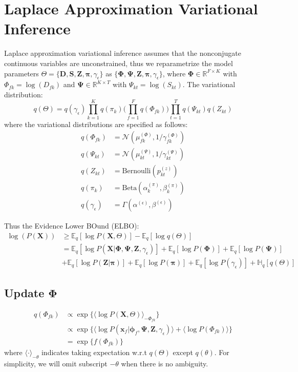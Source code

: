 \documentclass[11pt]{article} %
\begin{document}
\section{Laplace Approximation Variational Inference}
Laplace approximation variational inference assumes that the nonconjugate continuous variables are unconstrained, thus we reparametrize the model parameters $\Theta = \{\mathbf{D}, \mathbf{S}, \mathbf{Z}, \bm{\pi}, \gamma_\epsilon\}$ as $\{\mathbf{\Phi}, \mathbf{\Psi}, \mathbf{Z}, \bm{\pi}, \gamma_\epsilon\}$, where $\mathbf{\Phi} \in \mathbb{R}^{F\times K}$ with $\Phi_{fk} = \log(D_{fk})$ and $\mathbf{\Psi} \in \mathbb{R}^{K \times T}$ with $\Psi_{kt} = \log(S_{kt})$.
The variational distribution: 
\[
q(\Theta) = q(\gamma_\epsilon)\prod_{k=1}^K q(\pi_k) \biggl(\prod_{f=1}^F q(\Phi_{fk}) \biggl) \prod_{t=1}^T q(\Psi_{kt}) q(Z_{kt}) 
\]
where the variational distributions are specified as follows:
\begin{align*}
q(\Phi_{fk}) &= \mathcal{N}(\mu_{fk}^{(\Phi)}, 1/\gamma_{fk}^{(\Phi)})\\
q(\Psi_{kt}) &= \mathcal{N}(\mu_{kt}^{(\Psi)}, 1/\gamma_{kt}^{(\Psi)})\\
q(Z_{kt}) &= \textrm{Bernoulli}(p_{kt}^{(z)})\\
q(\pi_{k}) &= \textrm{Beta}(\alpha_k^{(\pi)}, \beta_k^{(\pi)})\\
q(\gamma_\epsilon) &= \Gamma(\alpha^{(\epsilon)}, \beta^{(\epsilon)})
\end{align*}

Thus the Evidence Lower BOund (ELBO):
\begin{align*}
\log(P(\mathbf{X})) &\geq \mathbb{E}_q [\log P(\mathbf{X}, \Theta)] - \mathbb{E}_q [\log q(\Theta)]\\
&= \mathbb{E}_q [\log P(\mathbf{X} | \mathbf{\Phi}, \mathbf{\Psi}, \mathbf{Z}, \gamma_\epsilon)] + \mathbb{E}_q [\log P(\mathbf{\Phi})] + \mathbb{E}_q [\log P(\mathbf{\Psi})]\\
 &+ \mathbb{E}_q[\log P(\mathbf{Z} | \bm{\pi})] + \mathbb{E}_q[\log P(\bm{\pi})] + \mathbb{E}_q[\log P(\gamma_\epsilon)] + \mathbb{H}_q [q(\Theta)] 
\end{align*}


\subsection{Update $\mathbf{\Phi}$}\label{sec:phi}
\begin{align*}
q(\Phi_{fk}) &\propto \exp\{\langle\log P(\mathbf{X}, \Theta)\rangle_{-\Phi_{fk}}\}\\
&\propto \exp\{\langle \log P(\bm{x}_f | \bm{\phi}_f, \bm{\Psi}, \mathbf{Z}, \gamma_\epsilon)\rangle + \langle \log P(\Phi_{fk}) \rangle\}\\
&= \exp\{f(\Phi_{fk})\}
\end{align*}
where $\langle \cdot \rangle_{-\theta}$ indicates taking expectation w.r.t $q(\Theta)$ except $q(\theta)$. For simplicity, we will omit subscript $-\theta$ when there is no ambiguity.
\end{document}
